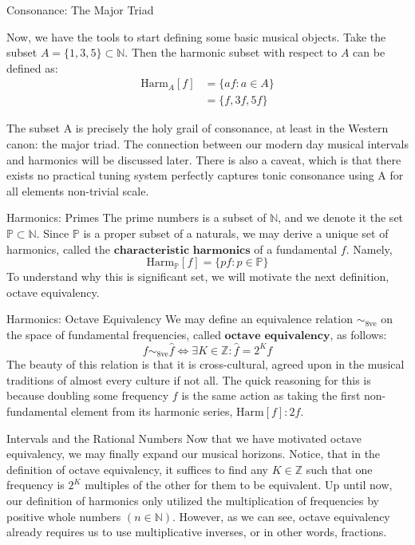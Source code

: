 \documentclass[usenames,dvipsnames]{beamer}
\newcommand{\N}{\mathbb{N}}
\newcommand{\Z}{\mathbb{Z}}
\newcommand{\Prms}{\mathbb{P}}
\newcommand{\octave}{\sim_{8\text{ve}}}
\newcommand{\harm}{\text{Harm}}
\begin{document}
  \begin{frame}{Consonance: The Major Triad}

Now, we have the tools to start defining some basic musical objects. Take the subset $A  = \{1,3,5\} \subset \N$. Then the harmonic subset with respect to $A$ can be defined as: 
  \begin{align*}
  \text{Harm}_A [f] &= \{af : a \in A\} \\
			    &=\{f,3f,5f\}
   \end{align*}

The subset A is precisely the holy grail of consonance, at least in the Western canon: the major triad. The connection between our modern day musical intervals and harmonics will be discussed later. There is also a caveat, which is that there exists no practical tuning system perfectly captures tonic consonance using A for all elements non-trivial scale.

  \end{frame}
  
    \begin{frame}{Harmonics: Primes}
The prime numbers is a subset of $\mathbb{N}$, and we denote it the set $\mathbb{P} \subset \mathbb{N}$. Since $\mathbb{P}$ is a proper subset of a naturals, we may derive a unique set of harmonics, called the $\textbf{characteristic harmonics}$ of a fundamental $f$. Namely,
$$   \text{Harm}_\Prms [f] = \{pf : p \in \mathbb{P}\} $$
To understand why this is significant set, we will motivate the next definition, octave equivalency.
  \end{frame}
  
  \begin{frame}{Harmonics: Octave Equivalency}
  We may define an equivalence relation $\octave$ on the space of fundamental frequencies, called $\textbf{octave equivalency}$, as follows:
  $$ f  \octave \hat{f} \iff \exists K \in \Z : \hat{f} = 2^{K} f $$
  The beauty of this relation is that it is cross-cultural, agreed upon in the musical traditions of almost every culture if not all. The quick reasoning for this is because doubling some frequency $f$ is the same action as taking the first non-fundamental element from its harmonic series, $\harm [f]: 2f$.
  \end{frame}
  
  \begin{frame}{Intervals and the Rational Numbers}
  Now that we have motivated octave equivalency, we may finally expand our musical horizons. Notice, that in the definition of octave equivalency, it suffices to find any $K \in \Z$ such that one frequency is $2^K$ multiples of the other for them to be equivalent. \newline Up until now, our definition of harmonics only utilized the multiplication of frequencies by positive whole numbers $(n \in \N)$. However, as we can see, octave equivalency already requires us to use multiplicative inverses, or in other words, fractions.
  \end{frame}
  
\end{document}
